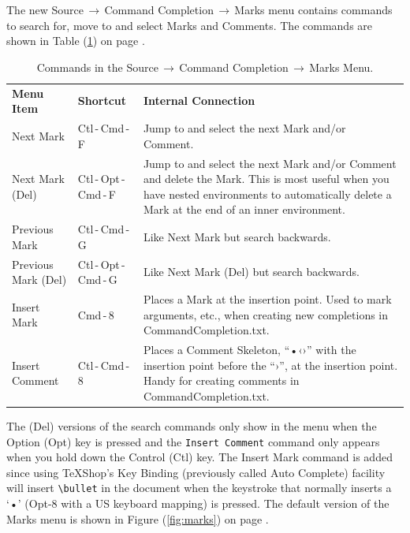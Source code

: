 \documentclass[11pt]{article}
\newcommand{\optkey}{\textsf{Opt}}
\newcommand{\ctlkey}{\textsf{Ctl}}
\newcommand{\cmdkey}{\textsf{Cmd}}
\newcommand{\mnu}[1]{\textsf{#1}}
\newcommand{\To}{\,\(\to\)\,}
\newcommand{\TS}{\textsf{\TeX Shop}}
\newcommand{\CCT}{\textsf{CommandCompletion.txt}}
\begin{document}
The new \mnu{Source}\To\mnu{Command Completion}\To\mnu{Marks} menu contains commands to search for, move to and select Marks and Comments. The commands are shown in Table (\ref{tbl:menu}) on page \pageref{tbl:menu}.
\begin{table}
\centering
\begin{tabular}{llp{6.7cm}}
{\bfseries Menu Item} & {\bfseries Shortcut} & {\bfseries Internal Connection} \\
\cmidrule[0.5pt](lr){1-1} \cmidrule[0.5pt](lr){2-2} \cmidrule[0.5pt](lr){3-3}
\sffamily Next Mark & \ctlkey\,-\,\cmdkey\,-\,\textsf{F} & Jump to and select the next Mark and/or Comment. \\
\sffamily Next Mark (Del) & \ctlkey\,-\,\optkey\,-\,\cmdkey\,-\,\textsf{F} & Jump to and select the next Mark and/or Comment and delete the Mark. This is most useful when you have nested environments to automatically delete a Mark at the end of an inner environment.  \\
\sffamily Previous Mark & \ctlkey\,-\,\cmdkey\,-\,\textsf{G} & Like \textsf{Next Mark} but search backwards. \\
\sffamily Previous Mark (Del) & \ctlkey\,-\,\optkey\,-\,\cmdkey\,-\,\textsf{G} & Like \textsf{Next Mark (Del)} but search backwards. \\
\sffamily Insert Mark & \cmdkey\,-\,\textsf{8} & Places a Mark at the insertion point. Used to mark arguments, etc., when creating new completions in \CCT. \\
\sffamily Insert Comment & \ctlkey\,-\,\cmdkey\,-\,\textsf{8} & Places a Comment Skeleton, ``•‹›'' with the insertion point before the ``›'', at the insertion point. Handy for creating comments in \CCT. \\
\end{tabular}
\caption{Commands in the \mnu{Source}\To\mnu{Command Completion}\To\mnu{Marks} Menu.}
\label{tbl:menu}
\end{table}
The \mnu{(Del)} versions of the search commands only show in the menu when the Option (\optkey) key is pressed and the \texttt{Insert Comment} command only appears when you hold down the Control (\ctlkey) key. The \mnu{Insert Mark} command is added since using \TS's Key Binding (previously called Auto Complete) facility will insert \texttt{\textbackslash bullet} in the document when the keystroke that normally inserts a `•' (\mnu{\optkey-8} with a \textsc{US} keyboard mapping) is pressed. The default version of the \mnu{Marks} menu is shown in Figure (\ref{fig:marks}) on page \pageref{fig:marks}.
\end{document}

